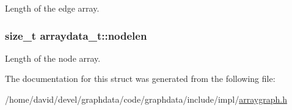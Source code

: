 Length of the edge array. 

\subsubsection[{\texorpdfstring{nodelen}{nodelen}}]{\setlength{\rightskip}{0pt plus 5cm}size\+\_\+t arraydata\+\_\+t\+::nodelen}\hypertarget{structarraydata__t_ab7b4b6740dd5353c323233dea2e2eaee}{}\label{structarraydata__t_ab7b4b6740dd5353c323233dea2e2eaee}


Length of the node array. 



The documentation for this struct was generated from the following file\+:\begin{DoxyCompactItemize}
\item 
/home/david/devel/graphdata/code/graphdata/include/impl/\hyperlink{arraygraph_8h}{arraygraph.\+h}\end{DoxyCompactItemize}
